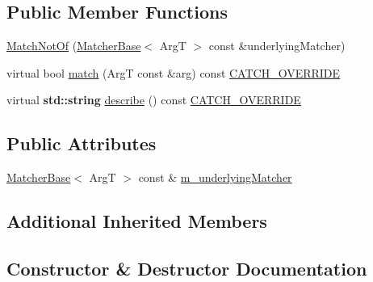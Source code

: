 \subsection*{Public Member Functions}
\begin{DoxyCompactItemize}
\item 
\hyperlink{struct_catch_1_1_matchers_1_1_impl_1_1_match_not_of_a47afdd9e4c3354cef85adc3186097ae4}{Match\+Not\+Of} (\hyperlink{struct_catch_1_1_matchers_1_1_impl_1_1_matcher_base}{Matcher\+Base}$<$ ArgT $>$ const \&underlying\+Matcher)
\item 
virtual bool \hyperlink{struct_catch_1_1_matchers_1_1_impl_1_1_match_not_of_a1b9ad6566e4ab0f292d2903f557307cc}{match} (ArgT const \&arg) const \hyperlink{catch_8hpp_a8ecdce4d3f57835f707915ae831eb847}{C\+A\+T\+C\+H\+\_\+\+O\+V\+E\+R\+R\+I\+DE}
\item 
virtual \textbf{ std\+::string} \hyperlink{struct_catch_1_1_matchers_1_1_impl_1_1_match_not_of_a62bdc7dcb9ff000438a4ed3d5483a248}{describe} () const \hyperlink{catch_8hpp_a8ecdce4d3f57835f707915ae831eb847}{C\+A\+T\+C\+H\+\_\+\+O\+V\+E\+R\+R\+I\+DE}
\end{DoxyCompactItemize}
\subsection*{Public Attributes}
\begin{DoxyCompactItemize}
\item 
\hyperlink{struct_catch_1_1_matchers_1_1_impl_1_1_matcher_base}{Matcher\+Base}$<$ ArgT $>$ const  \& \hyperlink{struct_catch_1_1_matchers_1_1_impl_1_1_match_not_of_af7ac67f112b0e93796b048a47329aad4}{m\+\_\+underlying\+Matcher}
\end{DoxyCompactItemize}
\subsection*{Additional Inherited Members}


\subsection{Constructor \& Destructor Documentation}
\mbox{\label{struct_catch_1_1_matchers_1_1_impl_1_1_match_not_of_a47afdd9e4c3354cef85adc3186097ae4}} 
